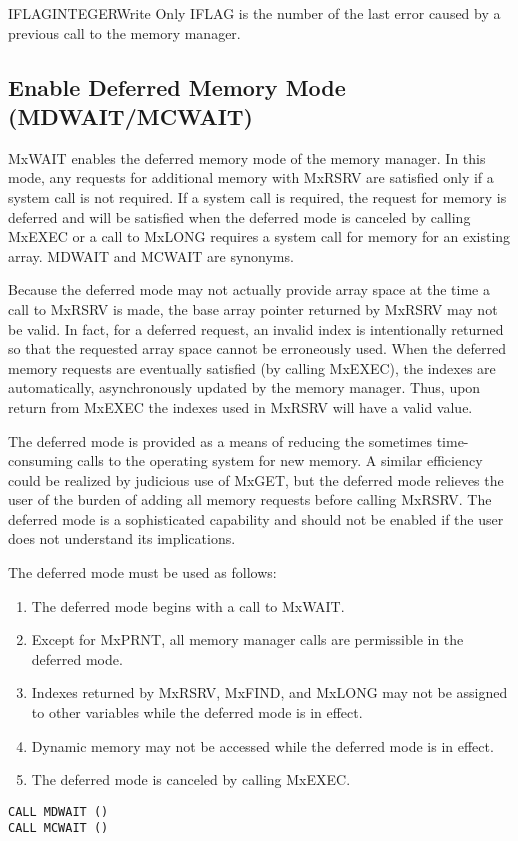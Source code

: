 \begin{argy}{IFLAG}{INTEGER}{Write Only}
IFLAG is the number of the last error caused by a previous call to the
memory manager. 
\end{argy}

\subsection{Enable Deferred Memory Mode (MDWAIT/MCWAIT)} \label{sec:wait}
MxWAIT enables the deferred memory mode of the memory manager. In
this mode, any requests for additional memory with MxRSRV are
satisfied only if a system call is not required. If a system call is
required, the request for memory is deferred and will be satisfied when the
deferred mode is canceled by calling MxEXEC or a call to
MxLONG requires a system call for memory for an existing array.
MDWAIT and MCWAIT are synonyms. 

Because the deferred mode may not actually provide array space at the time a
call to MxRSRV is made, the base array pointer re\-turn\-ed by
MxRSRV may not be valid. In fact, for a deferred request, an invalid
index is intentionally returned so that the requested array space cannot
be erroneously used. When the deferred memory requests are eventually
satisfied (by calling MxEXEC), the indexes are automatically,
asynchronously updated by the memory manager. Thus, upon return from
MxEXEC the indexes used in MxRSRV will have a valid value. 

The deferred mode is provided as a means of reducing the sometimes
time-consuming calls to the operating system for new memory. A similar
efficiency could be realized by judicious use of MxGET, but the
deferred mode relieves the user of the burden of adding all memory requests
before calling MxRSRV. The deferred mode is a sophisticated
capability and should not be enabled if the user does not understand its
implications. 

The deferred mode must be used as follows:
\begin{enumerate}
\item The deferred mode begins with a call to MxWAIT.
\item Except for MxPRNT, all memory manager calls are permissible
in the deferred mode.
\item Indexes returned by MxRSRV, MxFIND, and MxLONG
may not be assigned to other variables while the deferred mode is
in effect. 
\item Dynamic memory may not be accessed while the deferred mode is in
effect.
\item The deferred mode is canceled by calling MxEXEC.
\end{enumerate}
\begin{verbatim}
CALL MDWAIT ()
CALL MCWAIT ()
\end{verbatim}


